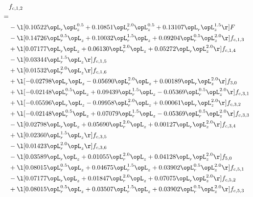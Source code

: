 \begin{alignat}{2} 
\label{eq:f_12_2} 
& f_{c,1,2} \nonumber \\ 
 = \\ 
& - \l[  0.10522 \opL_r \opL_z^{0.5} +  0.10851 \opL_r^{2.0} \opL_z^{0.5} +  0.13107 \opL_r \opL_z^{1.5}  \r] F \nonumber \\ 
& - \l[  0.14726 \opL_r^{0.5} \opL_z +  0.10032 \opL_r^{1.5} \opL_z +  0.09204 \opL_r^{0.5} \opL_z^{2.0}  \r] f_{c,1,3} \nonumber \\ 
& + \l[  0.07177 \opL_r \opL_z +  0.06130 \opL_r^{2.0} \opL_z +  0.05272 \opL_r \opL_z^{2.0}  \r] f_{c,1,4} \nonumber \\ 
& - \l[  0.03344 \opL_r^{1.5} \opL_z  \r] f_{c,1,5} \nonumber \\ 
& + \l[  0.01532 \opL_r^{2.0} \opL_z  \r] f_{c,1,6} \nonumber \\ 
& + \l[  -0.02798 \opL_r \opL_z   -0.05690 \opL_r^{2.0} \opL_z +  0.00189 \opL_r \opL_z^{2.0}  \r] f_{3,0} \nonumber \\ 
& + \l[  -0.02148 \opL_r^{0.5} \opL_z +  0.09439 \opL_r^{1.5} \opL_z   -0.05369 \opL_r^{0.5} \opL_z^{2.0}  \r] f_{c,3,1} \nonumber \\ 
& + \l[  -0.05596 \opL_r \opL_z   -0.09958 \opL_r^{2.0} \opL_z +  0.00061 \opL_r \opL_z^{2.0}  \r] f_{c,3,2} \nonumber \\ 
& + \l[  -0.02148 \opL_r^{0.5} \opL_z +  0.07079 \opL_r^{1.5} \opL_z   -0.05369 \opL_r^{0.5} \opL_z^{2.0}  \r] f_{c,3,3} \nonumber \\ 
& - \l[  0.02798 \opL_r \opL_z +  0.05690 \opL_r^{2.0} \opL_z +  0.00127 \opL_r \opL_z^{2.0}  \r] f_{c,3,4} \nonumber \\ 
& + \l[  0.02360 \opL_r^{1.5} \opL_z  \r] f_{c,3,5} \nonumber \\ 
& - \l[  0.01423 \opL_r^{2.0} \opL_z  \r] f_{c,3,6} \nonumber \\ 
& - \l[  0.03589 \opL_r \opL_z +  0.01055 \opL_r^{2.0} \opL_z +  0.04128 \opL_r \opL_z^{2.0}  \r] f_{5,0} \nonumber \\ 
& + \l[  0.08015 \opL_r^{0.5} \opL_z +  0.04675 \opL_r^{1.5} \opL_z +  0.03902 \opL_r^{0.5} \opL_z^{2.0}  \r] f_{c,5,1} \nonumber \\ 
& - \l[  0.07177 \opL_r \opL_z +  0.01847 \opL_r^{2.0} \opL_z +  0.07075 \opL_r \opL_z^{2.0}  \r] f_{c,5,2} \nonumber \\ 
& + \l[  0.08015 \opL_r^{0.5} \opL_z +  0.03507 \opL_r^{1.5} \opL_z +  0.03902 \opL_r^{0.5} \opL_z^{2.0}  \r] f_{c,5,3} \nonumber \\ 

\end{alignat}
